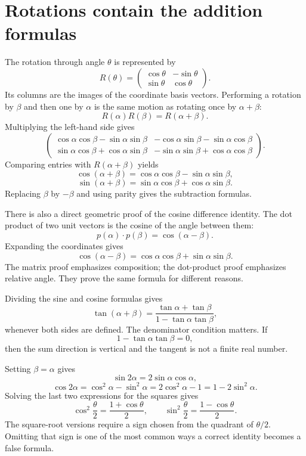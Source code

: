 \section{Rotations contain the addition formulas}

The rotation through angle \(\theta\) is represented by
\[
  R(\theta)=
  \begin{pmatrix}
    \cos\theta&-\sin\theta\\
    \sin\theta&\cos\theta
  \end{pmatrix}.
\]
Its columns are the images of the coordinate basis vectors.  Performing a rotation by \(\beta\) and then one by \(\alpha\) is the same motion as rotating once by \(\alpha+\beta\):
\[
  R(\alpha)R(\beta)=R(\alpha+\beta).
\]
Multiplying the left-hand side gives
\[
  \begin{pmatrix}
    \cos\alpha\cos\beta-\sin\alpha\sin\beta
    &-\cos\alpha\sin\beta-\sin\alpha\cos\beta\\
    \sin\alpha\cos\beta+\cos\alpha\sin\beta
    &-\sin\alpha\sin\beta+\cos\alpha\cos\beta
  \end{pmatrix}.
\]
Comparing entries with \(R(\alpha+\beta)\) yields
\[
  \cos(\alpha+\beta)
  =\cos\alpha\cos\beta-\sin\alpha\sin\beta,
\]
\[
  \sin(\alpha+\beta)
  =\sin\alpha\cos\beta+\cos\alpha\sin\beta.
\]
Replacing \(\beta\) by \(-\beta\) and using parity gives the subtraction formulas.

There is also a direct geometric proof of the cosine difference identity.  The dot product of two unit vectors is the cosine of the angle between them:
\[
  p(\alpha)\cdot p(\beta)=\cos(\alpha-\beta).
\]
Expanding the coordinates gives
\[
  \cos(\alpha-\beta)
  =\cos\alpha\cos\beta+\sin\alpha\sin\beta.
\]
The matrix proof emphasizes composition; the dot-product proof emphasizes relative angle.  They prove the same formula for different reasons.

Dividing the sine and cosine formulas gives
\[
  \tan(\alpha+\beta)
  =\frac{\tan\alpha+\tan\beta}
  {1-\tan\alpha\tan\beta},
\]
whenever both sides are defined.  The denominator condition matters.  If
\[
  1-\tan\alpha\tan\beta=0,
\]
then the sum direction is vertical and the tangent is not a finite real number.

Setting \(\beta=\alpha\) gives
\[
  \sin2\alpha=2\sin\alpha\cos\alpha,
\]
\[
  \cos2\alpha
  =\cos^2\alpha-\sin^2\alpha
  =2\cos^2\alpha-1
  =1-2\sin^2\alpha.
\]
Solving the last two expressions for the squares gives
\[
  \cos^2\frac\theta2=\frac{1+\cos\theta}{2},
  \qquad
  \sin^2\frac\theta2=\frac{1-\cos\theta}{2}.
\]
The square-root versions require a sign chosen from the quadrant of \(\theta/2\).  Omitting that sign is one of the most common ways a correct identity becomes a false formula.

